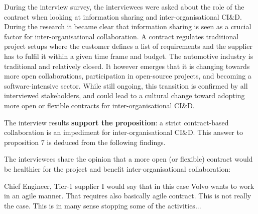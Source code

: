 During the interview survey, the interviewees were asked about the role of the contract when looking at information sharing and inter-organisational CI\&D. During the research it became clear that information sharing is seen as a crucial factor for inter-organisational collaboration. A contract regulates traditional project setups where the customer defines a list of requirements and the supplier has to fulfil it within a given time frame and budget. The automotive industry is traditional and relatively closed. It however emerges that it is changing towards more open collaborations, %
participation in open-source projects, and becoming a software-intensive sector. While still ongoing, this transition is confirmed by all interviewed stakeholders, and could lead to a cultural change toward adopting more open or flexible contracts for inter-organisational CI\&D.

The interview results {\bf support the proposition}: a strict contract-based collaboration is an impediment for inter-organisational CI\&D. This answer to proposition 7 is deduced from the following findings.


 The interviewees share the opinion that a more open (or flexible) contract would be healthier for the project and benefit inter-organisational collaboration: 

\begin{aquote}{Chief Engineer, Tier-1 supplier}
I would say that in this case Volvo wants to work in an agile manner. That requires also basically agile contract. This is not really the case. This is in many sense stopping some of the activities...
\end{aquote}
%
%
%


